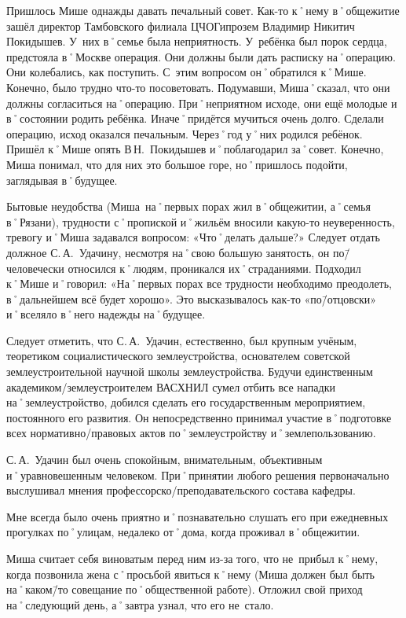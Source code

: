 Пришлось Мише однажды давать печальный совет. Как-то к˚нему в˚общежитие зашёл директор Тамбовского филиала ЦЧОГипрозем Владимир Никитич Покидышев. У~них в˚семье была неприятность. У~ребёнка был порок сердца, предстояла в˚Москве операция. Они должны были дать расписку на˚операцию. Они колебались, как поступить. С~этим вопросом он˚обратился к˚Мише. Конечно, было трудно что-то посоветовать. Подумавши, Миша˚сказал, что они должны согласиться на˚операцию. При˚неприятном исходе, они ещё молодые и в˚состоянии родить ребёнка. Иначе˚придётся мучиться очень долго. Сделали операцию, исход оказался печальным. Через˚год у˚них родился ребёнок. Пришёл к˚Мише опять В\,Н.~Покидышев и˚поблагодарил за˚совет. Конечно, Миша понимал, что для них это большое горе, но˚пришлось подойти, заглядывая в˚будущее.

Бытовые неудобства (Миша~на˚первых порах жил в˚общежитии, а˚семья в˚Рязани), трудности с˚пропиской и˚жильём вносили какую-то неуверенность, тревогу и˚Миша задавался вопросом: «Что˚делать дальше?» Следует отдать должное С.\,А.~Удачину, несмотря на˚свою большую занятость, он по\=/человечески относился к˚людям, проникался их˚страданиями. Подходил к˚Мише и˚говорил: «На˚первых порах все трудности необходимо преодолеть, в˚дальнейшем всё будет хорошо». Это высказывалось как-то «по\=/отцовски» и˚вселяло в˚него надежды на˚будущее.

Следует отметить, что С.\,А.~Удачин, естественно, был крупным учёным, теоретиком социалистического землеустройства, основателем советской землеустроительной научной школы землеустройства. Будучи единственным академиком\-/землеустроителем ВАСХНИЛ сумел отбить все нападки на˚землеустройство, добился сделать его государственным мероприятием, постоянного его развития. Он непосредственно принимал участие в˚подготовке всех нормативно\-/правовых актов по˚землеустройству и˚землепользованию. 

С.\,А.~Удачин был очень спокойным, внимательным, объективным и˚уравновешенным человеком. При˚принятии любого решения первоначально выслушивал мнения профессорско\-/преподавательского состава кафедры. 

Мне всегда было очень приятно и˚познавательно слушать его при ежедневных прогулках по˚улицам, недалеко от˚дома, когда проживал в˚общежитии.

Миша считает себя виноватым перед ним из-за того, что не~прибыл к˚нему, когда позвонила жена с˚просьбой явиться к˚нему (Миша должен был быть на˚каком\=/то совещание по˚общественной работе). Отложил свой приход на˚следующий день, а˚завтра узнал, что его не~стало.

